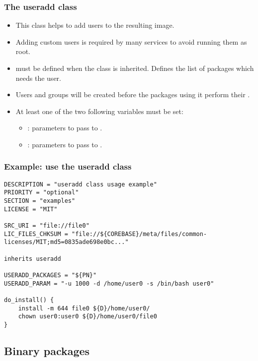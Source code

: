 \begin{frame}
  \frametitle{The useradd class}
  \begin{itemize}
    \item This class helps to add users to the resulting image.
    \item Adding custom users is required by many services to avoid
          running them as root.
    \item {} must be defined when the
           class is inherited. Defines the list of
          packages which needs the user.
    \item Users and groups will be created before the packages using
          it perform their .
    \item At least one of the two following variables must be set:
    \begin{itemize}
      \item {}: parameters to pass to
            .
      \item {}: parameters to pass to
            .
    \end{itemize}
  \end{itemize}
\end{frame}

\begin{frame}[fragile]
  \frametitle{Example: use the useradd class}
  \begin{block}{}
    \begin{verbatim}
DESCRIPTION = "useradd class usage example"
PRIORITY = "optional"
SECTION = "examples"
LICENSE = "MIT"

SRC_URI = "file://file0"
LIC_FILES_CHKSUM = "file://${COREBASE}/meta/files/common-licenses/MIT;md5=0835ade698e0bc..."

inherits useradd

USERADD_PACKAGES = "${PN}"
USERADD_PARAM = "-u 1000 -d /home/user0 -s /bin/bash user0"

do_install() {
    install -m 644 file0 ${D}/home/user0/
    chown user0:user0 ${D}/home/user0/file0
}
    \end{verbatim}
  \end{block}
\end{frame}

\subsection{Binary packages}

